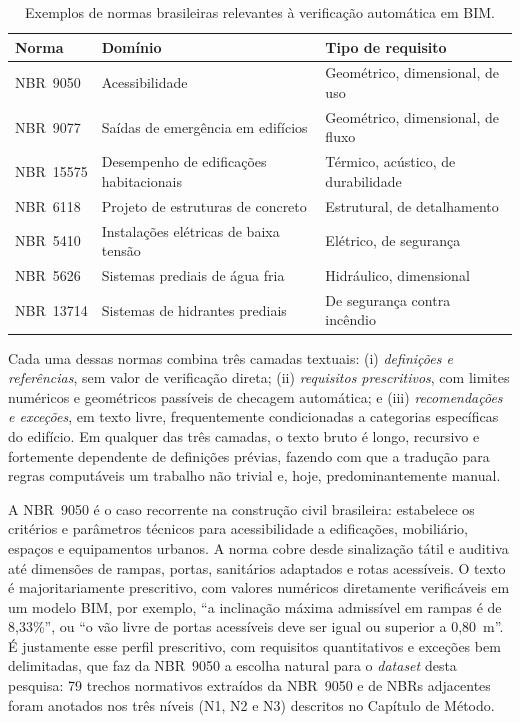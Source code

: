 \begin{table}[ht]
\centering
\caption{Exemplos de normas brasileiras relevantes à verificação automática em BIM.}
\label{tab:nbrs}
\small
\begin{tabular}{lll}
\hline
Norma          & Domínio                                     & Tipo de requisito \\
\hline
NBR~9050       & Acessibilidade                              & Geométrico, dimensional, de uso \\
NBR~9077       & Saídas de emergência em edifícios            & Geométrico, dimensional, de fluxo \\
NBR~15575      & Desempenho de edificações habitacionais      & Térmico, acústico, de durabilidade \\
NBR~6118       & Projeto de estruturas de concreto           & Estrutural, de detalhamento \\
NBR~5410       & Instalações elétricas de baixa tensão        & Elétrico, de segurança \\
NBR~5626       & Sistemas prediais de água fria              & Hidráulico, dimensional \\
NBR~13714      & Sistemas de hidrantes prediais              & De segurança contra incêndio \\
\hline
\end{tabular}
\end{table}

Cada uma dessas normas combina três camadas textuais: (i) \textit{definições e referências}, sem valor de verificação direta; (ii) \textit{requisitos prescritivos}, com limites numéricos e geométricos passíveis de checagem automática; e (iii) \textit{recomendações e exceções}, em texto livre, frequentemente condicionadas a categorias específicas do edifício. Em qualquer das três camadas, o texto bruto é longo, recursivo e fortemente dependente de definições prévias, fazendo com que a tradução para regras computáveis um trabalho não trivial e, hoje, predominantemente manual.

A NBR~9050 \cite{abnt9050} é o caso recorrente na construção civil brasileira: estabelece os critérios e parâmetros técnicos para acessibilidade a edificações, mobiliário, espaços e equipamentos urbanos. A norma cobre desde sinalização tátil e auditiva até dimensões de rampas, portas, sanitários adaptados e rotas acessíveis. O texto é majoritariamente prescritivo, com valores numéricos diretamente verificáveis em um modelo BIM, por exemplo, ``a inclinação máxima admissível em rampas é de 8{,}33\%'', ou ``o vão livre de portas acessíveis deve ser igual ou superior a 0{,}80~m''. É justamente esse perfil prescritivo, com requisitos quantitativos e exceções bem delimitadas, que faz da NBR~9050 a escolha natural para o \textit{dataset} desta pesquisa: 79 trechos normativos extraídos da NBR~9050 e de NBRs adjacentes foram anotados nos três níveis (N1, N2 e N3) descritos no Capítulo de Método.

